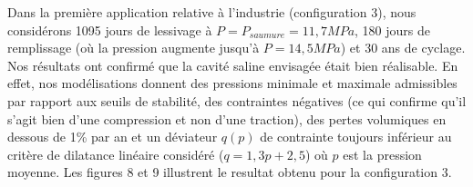 \documentclass[11pt,french,a4paper]{article}
\begin{document}
Dans la première application relative à l'industrie (configuration 3), nous considérons 1095 jours de lessivage à $P = P_{saumure} = 11,7 MPa$, 180 jours de remplissage (où la pression augmente jusqu’à $P = 14,5 MPa$) et 30 ans de cyclage. Nos résultats ont confirmé que la cavité saline envisagée était bien réalisable. En effet, nos modélisations donnent des pressions minimale et maximale admissibles par rapport aux seuils de stabilité, des contraintes négatives (ce qui confirme qu'il s'agit bien d'une compression et non d'une traction), des pertes volumiques en dessous de 1\% par an et un déviateur $q(p)$ de contrainte toujours inférieur au critère de dilatance linéaire considéré ($q = 1,3 p + 2,5$) où $p$ est la pression moyenne. Les figures 8 et 9 illustrent le resultat obtenu pour la configuration 3.\\
\end{document}

